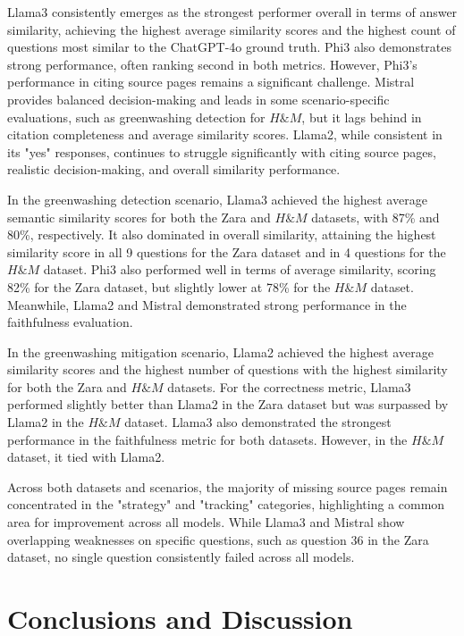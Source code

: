 \documentclass[]{article}
\begin{document}
Llama3 consistently emerges as the strongest performer overall in terms of answer similarity, 
achieving the highest average similarity scores and the highest count of questions most similar to the ChatGPT-4o ground truth.
Phi3 also demonstrates strong performance, often ranking second in both metrics. 
However, Phi3’s performance in citing source pages remains a significant challenge. Mistral provides balanced decision-making and leads in some scenario-specific evaluations,
such as greenwashing detection for $H\&M$, but it lags behind in citation completeness and average similarity scores. Llama2, while consistent in its "yes" responses, continues to struggle significantly with citing source pages, realistic decision-making, and overall similarity performance.

In the greenwashing detection scenario, Llama3 achieved the highest average semantic similarity scores for both the Zara and $H\&M$ datasets, with 87\% and 80\%, respectively. It also dominated in overall similarity, attaining the highest similarity score in all 9 questions for the Zara dataset and in 4 questions for the $H\&M$ dataset.  
Phi3 also performed well in terms of average similarity, scoring 82\% for the Zara dataset, but slightly lower at 78\% for the $H\&M$ dataset. Meanwhile, Llama2 and Mistral demonstrated strong performance in the faithfulness evaluation.

In the greenwashing mitigation scenario, Llama2 achieved the highest average similarity scores and the highest number of questions with the highest similarity for both the Zara and $H\&M$ datasets.  
For the correctness metric, Llama3 performed slightly better than Llama2 in the Zara dataset but was surpassed by Llama2 in the $H\&M$ dataset.  
Llama3 also demonstrated the strongest performance in the faithfulness metric for both datasets. However, in the $H\&M$ dataset, it tied with Llama2.

Across both datasets and scenarios, the majority of missing source pages remain concentrated in the "strategy" and "tracking" categories, highlighting a common area for improvement across all models. 
While Llama3 and Mistral show overlapping weaknesses on specific questions, such as question 36 in the Zara dataset, no single question consistently failed across all models.

\section{Conclusions and Discussion} \label{sec:conclusions}
\end{document}
